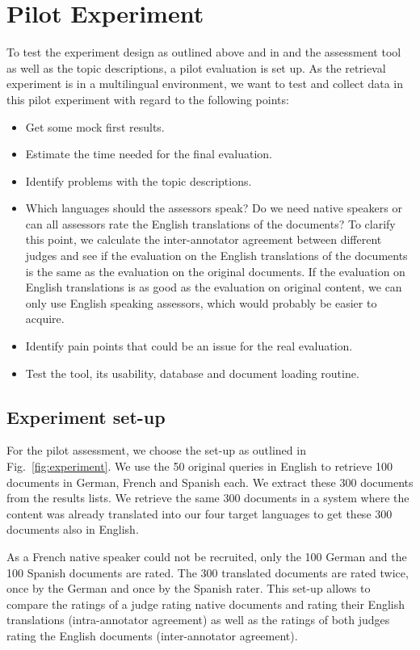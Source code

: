 \documentclass[a4paper,11pt]{article}
\begin{document}
\section{Pilot Experiment}
To test the experiment design as outlined above and in \cite{m1.3.2_2018} and the assessment tool as well as the topic descriptions, a pilot evaluation is set up. As the retrieval experiment is in a multilingual environment, we want to test and collect data in this pilot experiment with regard to the following points:

\begin{itemize}
    \item Get some mock first results.
    \item Estimate the time needed for the final evaluation.
    \item Identify problems with the topic descriptions.
    \item Which languages should the assessors speak? Do we need native speakers or can all assessors rate the English translations of the documents? To clarify this point, we calculate the inter-annotator agreement between different judges and see if the evaluation on the English translations of the documents is the same as the evaluation on the original documents. If the evaluation on English translations is as good as the evaluation on original content, we can only use English speaking assessors, which would probably be easier to acquire.
    \item Identify pain points that could be an issue for the real evaluation.
    \item Test the tool, its usability, database and document loading routine.
\end{itemize}

\subsection{Experiment set-up}
For the pilot assessment, we choose the set-up as outlined in Fig.~\ref{fig:experiment}. We use the 50 original queries in English to retrieve 100 documents in German, French and Spanish each. We extract these 300 documents from the results lists. We retrieve the same 300 documents in a system where the content was already translated into our four target languages to get these 300 documents also in English.  

As a French native speaker could not be recruited, only the 100 German and the 100 Spanish documents are rated. The 300 translated documents are rated twice, once by the German and once by the Spanish rater. This set-up allows to compare the ratings of a judge rating native documents and rating their English translations (intra-annotator agreement) as well as the ratings of both judges rating the English documents (inter-annotator agreement).
\end{document}
